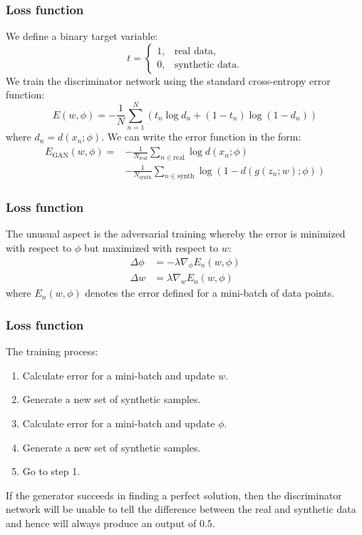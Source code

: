 \documentclass{beamer}
\begin{document}
\begin{frame}
    \frametitle{Loss function}
    We define a binary target variable:
    \begin{equation*}
        t=\begin{cases}
            1,&\textrm{real data,} \\
            0,&\textrm{synthetic data.}
        \end{cases}
    \end{equation*}
    We train the discriminator network using the standard cross-entropy error function:
    \begin{equation*}
        E(w,\phi)=-\frac{1}{N}\sum_{n=1}^{N}(t_{n}\log{}d_{n}+(1-t_{n})\log(1-d_{n}))
    \end{equation*}
    where $d_{n}=d(x_{n};\phi)$. We can write the error function in the form:
    \begin{align*}
        E_{\textrm{GAN}}(w,\phi)=&-\frac{1}{N_{\textrm{real}}}\sum_{n\in\textrm{real}}\log{}d(x_{n};\phi) \\
        &-\frac{1}{N_{\textrm{synth}}}\sum_{n\in\textrm{synth}}\log(1-d(g(z_{n};w);\phi))
    \end{align*}
\end{frame}

\begin{frame}
    \frametitle{Loss function}
    The unusual aspect is the adversarial training whereby the error is minimized with respect to $\phi$ but maximized with respect to $w$:
    \begin{align*}
        \Delta\phi&=-\lambda\nabla_{\phi}E_{n}(w,\phi) \\
        \Delta{}w&=\lambda\nabla_{w}E_{n}(w,\phi)
    \end{align*}
    where $E_{n}(w,\phi)$ denotes the error defined for a mini-batch of data points.
\end{frame}

\begin{frame}
    \frametitle{Loss function}
    The training process:
    \begin{enumerate}
        \item Calculate error for a mini-batch and update $w$.
        \item Generate a new set of synthetic samples.
        \item Calculate error for a mini-batch and update $\phi$.
        \item Generate a new set of synthetic samples.
        \item Go to step 1.
    \end{enumerate}
    If the generator succeeds in finding a perfect solution, then the discriminator network will be unable to tell the difference between the real and synthetic data and hence will always produce an output of $0.5$.
\end{frame}
\end{document}
